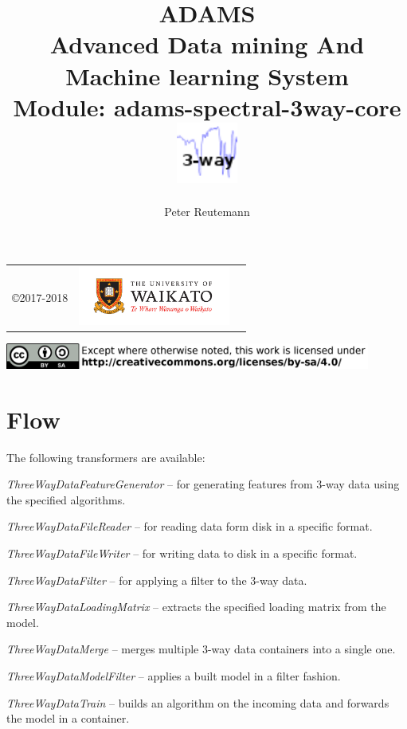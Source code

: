 \documentclass[a4paper]{book}
\title{
  \textbf{ADAMS} \\
  {\Large \textbf{A}dvanced \textbf{D}ata mining \textbf{A}nd \textbf{M}achine
  learning \textbf{S}ystem} \\
  {\Large Module: adams-spectral-3way-core} \\
  \vspace{1cm}
  \includegraphics[width=2cm]{images/spectral-3way-core-module.png} \\
}
\author{
  Peter Reutemann
}
\begin{document}
\begin{titlepage}
\maketitle

\thispagestyle{empty}
\center
\begin{table}[b]
	\begin{tabular}{c l l}
		\parbox[c][2cm]{2cm}{\copyright 2017-2018} &
		\parbox[c][2cm]{5cm}{\includegraphics[width=5cm]{images/coat_of_arms.pdf}} \\
	\end{tabular}
	\includegraphics[width=12cm]{images/cc.png} \\
\end{table}

\end{titlepage}

\tableofcontents

\chapter{Flow}
The following transformers are available:
\begin{tight_itemize}
  \item \textit{ThreeWayDataFeatureGenerator} -- for generating features from
  3-way data using the specified algorithms.
  \item \textit{ThreeWayDataFileReader} -- for reading data form disk in a
  specific format.
  \item \textit{ThreeWayDataFileWriter} -- for writing data to disk in a
  specific format.
  \item \textit{ThreeWayDataFilter} -- for applying a filter to the 3-way data.
  \item \textit{ThreeWayDataLoadingMatrix} -- extracts the specified loading matrix
  from the model.
  \item \textit{ThreeWayDataMerge} -- merges multiple 3-way data containers into a single one.
  \item \textit{ThreeWayDataModelFilter} -- applies a built model in a filter fashion.
  \item \textit{ThreeWayDataTrain} -- builds an algorithm on the incoming data
  and forwards the model in a container.
\end{tight_itemize}
\end{document}
